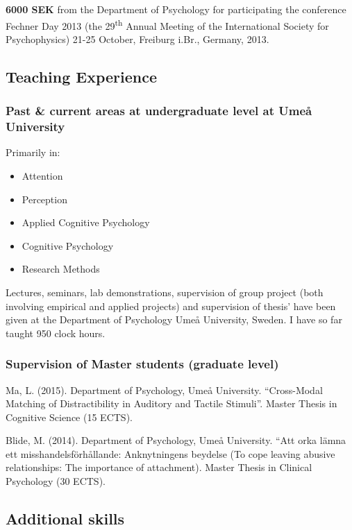 \documentclass[]{article}
\providecommand{\tightlist}{%
  \setlength{\itemsep}{0pt}\setlength{\parskip}{0pt}}
\begin{document}
\textbf{6000 SEK} from the Department of Psychology for participating
the conference Fechner Day 2013 (the 29\textsuperscript{th} Annual
Meeting of the International Society for Psychophysics) 21-25 October,
Freiburg i.Br., Germany, 2013.

\subsection{Teaching Experience}\label{teaching-experience}

\subsubsection{Past \& current areas at undergraduate level at Umeå
University}\label{past-current-areas-at-undergraduate-level-at-umea-university}

Primarily in:

\begin{itemize}
\tightlist
\item
  Attention
\item
  Perception
\item
  Applied Cognitive Psychology
\item
  Cognitive Psychology
\item
  Research Methods
\end{itemize}

Lectures, seminars, lab demonstrations, supervision of group project
(both involving empirical and applied projects) and supervision of
thesis' have been given at the Department of Psychology Umeå University,
Sweden. I have so far taught 950 clock hours.

\subsubsection{Supervision of Master students (graduate
level)}\label{supervision-of-master-students-graduate-level}

Ma, L. (2015). Department of Psychology, Umeå University. ``Cross-Modal
Matching of Distractibility in Auditory and Tactile Stimuli''. Master
Thesis in Cognitive Science (15 ECTS).

Blide, M. (2014). Department of Psychology, Umeå University. ``Att orka
lämna ett misshandelsförhållande: Anknytningens beydelse (To cope
leaving abusive relationships: The importance of attachment). Master
Thesis in Clinical Psychology (30 ECTS).

\subsection{Additional skills}\label{additional-skills}
\end{document}
